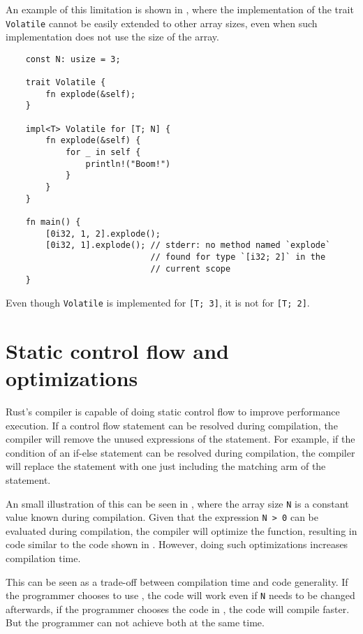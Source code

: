 An example of this limitation is shown in , where the
implementation of the trait \texttt{Volatile} cannot be easily extended to
other array sizes, even when such implementation does not use the size of the
array. 

\begin{listing}
	\begin{verbatim} 
    const N: usize = 3;

    trait Volatile {
        fn explode(&self);
    }

    impl<T> Volatile for [T; N] {
        fn explode(&self) {
            for _ in self {
                println!("Boom!")
            }
        }
    }

    fn main() {
        [0i32, 1, 2].explode(); 
        [0i32, 1].explode(); // stderr: no method named `explode` 
                             // found for type `[i32; 2]` in the
                             // current scope
    }
	\end{verbatim}
    \caption{Even though \texttt{Volatile} is implemented for \texttt{[T; 3]}, it is not for \texttt{[T; 2]}.}
  \label{lst:trait_array}
\end{listing}

\section{Static control flow and optimizations}
Rust's compiler is capable of doing static control flow to improve performance
execution. If a control flow statement can be resolved during compilation, the
compiler will remove the unused expressions of the statement. For example, if
the condition of an if-else statement can be resolved during compilation, the
compiler will replace the statement with one just including the matching arm of
the statement.

An small illustration of this can be seen in ,
where the array size \texttt{N} is a constant value known during compilation.
Given that the expression  \texttt{N > 0} can be evaluated during compilation,
the compiler will optimize the function, resulting in code similar to the code
shown in . However, doing such optimizations increases
compilation time. 

This can be seen as a trade-off between compilation time and code generality.
If the programmer chooses to use , the code will
work even if \texttt{N} needs to be changed afterwards, if the programmer
chooses the code in , the code will compile faster. But the
programmer can not achieve both at the same time.

